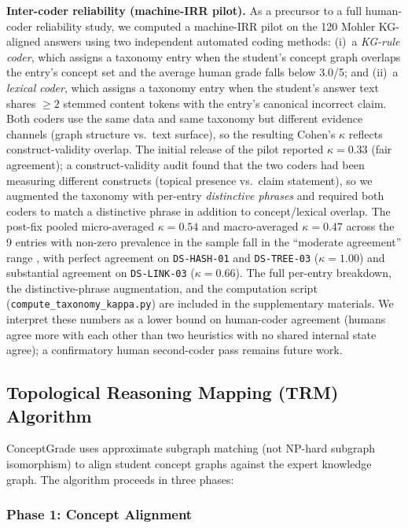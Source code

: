 \documentclass[conference]{IEEEtran}
\begin{document}
\textbf{Inter-coder reliability (machine-IRR pilot).} As a precursor to a full
human-coder reliability study, we computed a machine-IRR pilot on the 120 Mohler
KG-aligned answers using two independent automated coding methods: (i)~a
\emph{KG-rule coder}, which assigns a taxonomy entry when the student's concept
graph overlaps the entry's concept set and the average human grade falls below
3.0/5; and (ii)~a \emph{lexical coder}, which assigns a taxonomy entry when the
student's answer text shares $\geq 2$ stemmed content tokens with the entry's
canonical incorrect claim. Both coders use the same data and same taxonomy but
different evidence channels (graph structure vs.\ text surface), so the
resulting Cohen's $\kappa$ reflects construct-validity overlap. The initial
release of the pilot reported $\kappa = 0.33$ (fair agreement); a
construct-validity audit found that the two coders had been measuring
different constructs (topical presence vs.\ claim statement), so we augmented
the taxonomy with per-entry \emph{distinctive phrases} and required both
coders to match a distinctive phrase in addition to concept/lexical overlap.
The post-fix pooled micro-averaged $\kappa = 0.54$ and macro-averaged
$\kappa = 0.47$ across the 9 entries with non-zero prevalence in the sample
fall in the ``moderate agreement'' range \cite{Landis1977}, with perfect
agreement on \texttt{DS-HASH-01} and \texttt{DS-TREE-03} ($\kappa = 1.00$)
and substantial agreement on \texttt{DS-LINK-03} ($\kappa = 0.66$). The
full per-entry breakdown, the distinctive-phrase augmentation, and the
computation script (\texttt{compute\_taxonomy\_kappa.py}) are included in the
supplementary materials. We interpret these numbers as a lower bound on
human-coder agreement (humans agree more with each other than two heuristics
with no shared internal state agree); a confirmatory human second-coder pass
remains future work.

\subsection{Topological Reasoning Mapping (TRM) Algorithm}
\label{subsec:trm_algorithm}

ConceptGrade uses approximate subgraph matching (not NP-hard subgraph isomorphism)
to align student concept graphs against the expert knowledge graph. The algorithm
proceeds in three phases:

\subsubsection{Phase 1: Concept Alignment}
\end{document}
